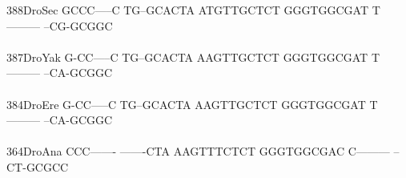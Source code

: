 \documentclass[11pt,twoside,reqno,a4paper]{article}
\begin{document}
{388\hspace*{1\charwidth}DroSec	GCCC-----C	TG--GCACTA	ATGTTGCTCT	GGGTGGCGAT	T---------	--CG-GCGGC	\\
\hspace*{4\charwidth}\hspace*{7\charwidth}\hspace*{1\charwidth}\hspace*{1\charwidth}\hspace*{1\charwidth}\hspace*{1\charwidth}\hspace*{1\charwidth}\hspace*{1\charwidth}\\
387\hspace*{1\charwidth}DroYak	G-CC-----C	TG--GCACTA	AAGTTGCTCT	GGGTGGCGAT	T---------	--CA-GCGGC	\\
\hspace*{4\charwidth}\hspace*{7\charwidth}\hspace*{1\charwidth}\hspace*{1\charwidth}\hspace*{1\charwidth}\hspace*{1\charwidth}\hspace*{1\charwidth}\hspace*{1\charwidth}\\
384\hspace*{1\charwidth}DroEre	G-CC-----C	TG--GCACTA	AAGTTGCTCT	GGGTGGCGAT	T---------	--CA-GCGGC	\\
\hspace*{4\charwidth}\hspace*{7\charwidth}\hspace*{1\charwidth}\hspace*{1\charwidth}\hspace*{1\charwidth}\hspace*{1\charwidth}\hspace*{1\charwidth}\hspace*{1\charwidth}\\
364\hspace*{1\charwidth}DroAna	CCC-------	-------CTA	AAGTTTCTCT	GGGTGGCGAC	C---------	--CT-GCGCC	\\
\hspace*{4\charwidth}\hspace*{7\charwidth}\hspace*{1\charwidth}\hspace*{1\charwidth}\hspace*{1\charwidth}\hspace*{1\charwidth}\hspace*{1\charwidth}\hspace*{1\charwidth}\\
}
\end{document}
